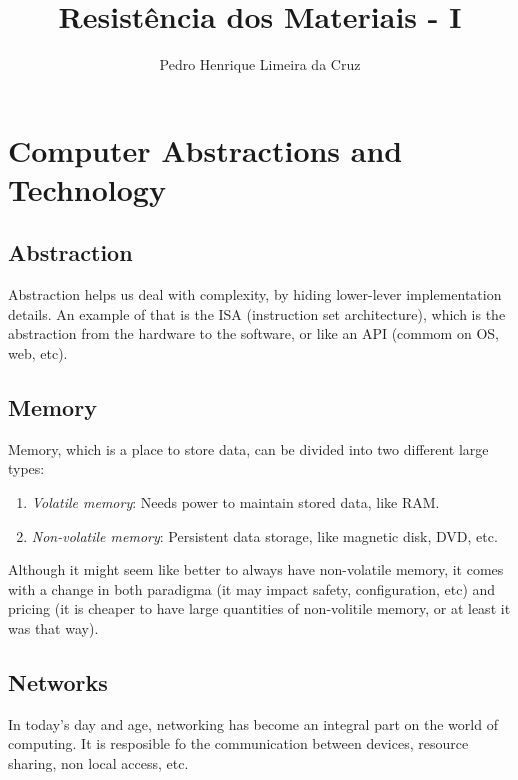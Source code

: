 \documentclass{article}
\author{Pedro Henrique Limeira da Cruz}
\title{Resistência dos Materiais - I}
\begin{document}
\maketitle
\thispagestyle{empty}


\newpage
\tableofcontents
\newpage

\section{Computer Abstractions and Technology}
\subsection*{Abstraction}
Abstraction helps us deal with complexity, by hiding lower-lever implementation details. An example of that is the ISA (instruction set architecture), which is the abstraction from the hardware to the software, or like an API (commom on OS, web, etc).

\subsection*{Memory}
Memory, which is a place to store data, can be divided into two different large types:
\begin{enumerate}
    \item \emph{Volatile memory}: Needs power to maintain stored data, like RAM.
    \item \emph{Non-volatile memory}: Persistent data storage, like magnetic disk, DVD, etc.
\end{enumerate}

Although it might seem like better to always have non-volatile memory, it comes with a change in both paradigma (it may impact safety, configuration, etc) and pricing (it is cheaper to have large quantities of non-volitile memory, or at least it was that way).

\subsection*{Networks}
In today's day and age, networking has become an integral part on the world of computing. It is resposible fo the communication between devices, resource sharing, non local access, etc.
\end{document}
